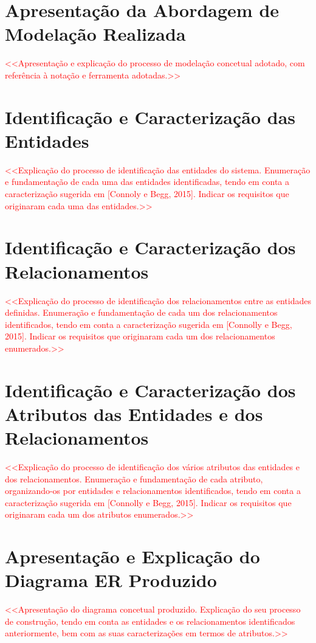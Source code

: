 \documentclass[a4paper,12pt]{scrreprt}
\begin{document}
    \section{Apresentação da Abordagem de Modelação Realizada}
        \textcolor{red}{
            <<Apresentação e explicação do processo de modelação concetual adotado, com referência à notação e ferramenta adotadas.>>
        }
    \section{Identificação e Caracterização das Entidades}
        \textcolor{red}{
            <<Explicação do processo de identificação das entidades do sistema. Enumeração e fundamentação de cada uma das entidades identificadas, tendo em conta a caracterização sugerida em [Connoly e Begg, 2015]. Indicar os requisitos que originaram cada uma das entidades.>>
        }
    \section{Identificação e Caracterização dos Relacionamentos}
        \textcolor{red}{
            <<Explicação do processo de identificação dos relacionamentos entre as entidades definidas. Enumeração e fundamentação de cada um dos relacionamentos identificados, tendo em conta a caracterização sugerida em [Connolly e Begg, 2015]. Indicar os requisitos que originaram cada um dos relacionamentos enumerados.>>
        }
    \section{Identificação e Caracterização dos Atributos das Entidades e dos Relacionamentos}
        \textcolor{red}{
            <<Explicação do processo de identificação dos vários atributos das entidades e dos relacionamentos. Enumeração e fundamentação de cada atributo, organizando-os por entidades e relacionamentos identificados, tendo em conta a caracterização sugerida em [Connolly e Begg, 2015]. Indicar os requisitos que originaram cada um dos atributos enumerados.>>
        }
    \section{Apresentação e Explicação do Diagrama ER Produzido}
        \textcolor{red}{
            <<Apresentação do diagrama concetual produzido. Explicação do seu processo de construção, tendo em conta as entidades e os relacionamentos identificados anteriormente, bem com as suas caracterizações em termos de atributos.>>
        }
\end{document}
